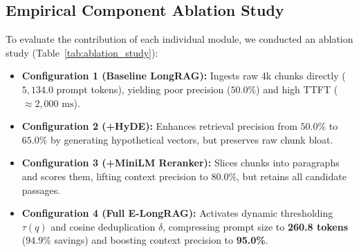 \documentclass[lettersize,journal]{IEEEtran}
\begin{document}
\begin{table}[!t]
\caption{State-of-the-Art Quantitative Comparison on Held-Out Multi-Hop Queries\label{tab:sota_comparison}}
\centering
{}
\end{table}

\subsection{Empirical Component Ablation Study}
To evaluate the contribution of each individual module, we conducted an ablation study (Table~\ref{tab:ablation_study}):
\begin{itemize}
    \item \textbf{Configuration 1 (Baseline LongRAG):} Ingests raw 4k chunks directly ($5,134.0$ prompt tokens), yielding poor precision ($50.0\%$) and high TTFT ($\approx 2,000\text{ ms}$).
    \item \textbf{Configuration 2 (+HyDE):} Enhances retrieval precision from $50.0\%$ to $65.0\%$ by generating hypothetical vectors, but preserves raw chunk bloat.
    \item \textbf{Configuration 3 (+MiniLM Reranker):} Slices chunks into paragraphs and scores them, lifting context precision to $80.0\%$, but retains all candidate passages.
    \item \textbf{Configuration 4 (Full E-LongRAG):} Activates dynamic thresholding $\tau(q)$ and cosine deduplication $\delta$, compressing prompt size to \textbf{260.8 tokens} ($94.9\%$ savings) and boosting context precision to \textbf{95.0\%}.
\end{itemize}
\end{document}
